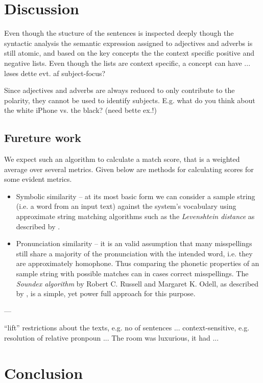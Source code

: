 
\chapter{Discussion}
\label{chap:Conclusion}

Even though the stucture of the sentences is inspected deeply though the syntactic analysis the semantic expression assigned to adjectives and adverbs is still atomic, and based on the key concepts the the context specific positive and negative lists. Even though the lists are context specific, a concept can have ... løses dette evt. af subject-focus?


Since adjectives and adverbs are always reduced to only contribute to the polarity, they cannot be used to identify subjects. E.g. what do you think about the white iPhone vs. the black? (need bette ex.!)

\section{Fureture work}
We expect such an algorithm to calculate a match score, that is a weighted average over several metrics. Given below are methods for calculating scores for some evident metrics.

\begin{itemize}
  \item Symbolic similarity -- at its most basic form we can consider a sample string (i.e. a word from an input text) against the system's vocabulary using approximate string matching algorithms such as the  \emph{Levenshtein distance} as described by \cite{Wagner}.

  \item Pronunciation similarity -- it is an valid assumption that many misspellings still share a majority of the pronunciation with the intended word, i.e. they are approximately homophone. Thus comparing the phonetic properties of an sample string with possible matches can in cases correct misspellings. The \emph{Soundex algorithm} by Robert C. Russell and Margaret K. Odell, as described by \cite[p. 391–92]{ACP3}, is a simple, yet power full approach for this purpose.

\end{itemize}

---

``lift'' restrictions about the texts, e.g. no of sentences ... context-sensitive, e.g. resolution of relative pronpoun ... The room was luxurious, it had ...

\chapter{Conclusion}
\label{chap:Conclusion}